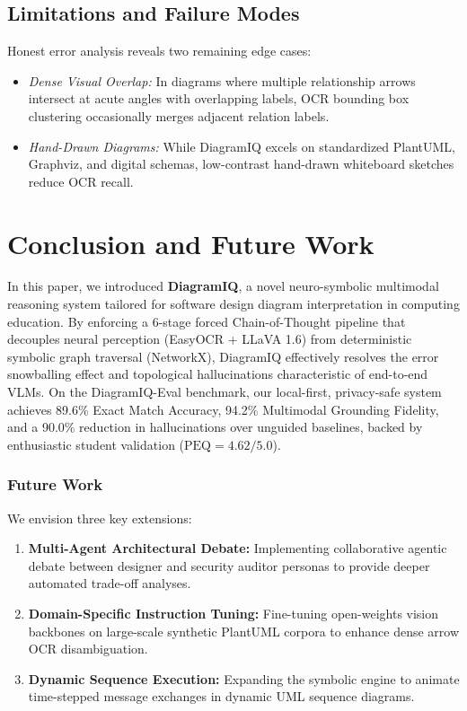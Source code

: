 \documentclass[runningheads]{llncs}
\begin{document}
\subsection{Limitations and Failure Modes}
Honest error analysis reveals two remaining edge cases:
\begin{itemize}
    \item \textit{Dense Visual Overlap:} In diagrams where multiple relationship arrows intersect at acute angles with overlapping labels, OCR bounding box clustering occasionally merges adjacent relation labels.
    \item \textit{Hand-Drawn Diagrams:} While DiagramIQ excels on standardized PlantUML, Graphviz, and digital schemas, low-contrast hand-drawn whiteboard sketches reduce OCR recall.
\end{itemize}

\section{Conclusion and Future Work}
\label{sec:conclusion}

In this paper, we introduced \textbf{DiagramIQ}, a novel neuro-symbolic multimodal reasoning system tailored for software design diagram interpretation in computing education. By enforcing a 6-stage forced Chain-of-Thought pipeline that decouples neural perception (EasyOCR + LLaVA 1.6) from deterministic symbolic graph traversal (NetworkX), DiagramIQ effectively resolves the error snowballing effect and topological hallucinations characteristic of end-to-end VLMs. On the DiagramIQ-Eval benchmark, our local-first, privacy-safe system achieves 89.6\% Exact Match Accuracy, 94.2\% Multimodal Grounding Fidelity, and a 90.0\% reduction in hallucinations over unguided baselines, backed by enthusiastic student validation ($\text{PEQ} = 4.62/5.0$).

\subsubsection{Future Work}
We envision three key extensions:
\begin{enumerate}
    \item \textbf{Multi-Agent Architectural Debate:} Implementing collaborative agentic debate between designer and security auditor personas to provide deeper automated trade-off analyses.
    \item \textbf{Domain-Specific Instruction Tuning:} Fine-tuning open-weights vision backbones on large-scale synthetic PlantUML corpora to enhance dense arrow OCR disambiguation.
    \item \textbf{Dynamic Sequence Execution:} Expanding the symbolic engine to animate time-stepped message exchanges in dynamic UML sequence diagrams.
\end{enumerate}
\end{document}
